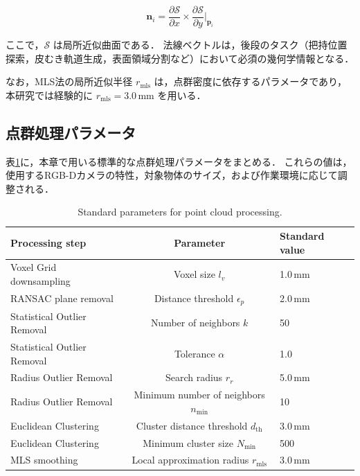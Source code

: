 \begin{equation}
  \bm{n}_i = \frac{\partial \mathcal{S}}{\partial x} \times \frac{\partial \mathcal{S}}{\partial y} \Big|_{\bm{p}_i}
\end{equation}

ここで，$\mathcal{S}$ は局所近似曲面である．
法線ベクトルは，後段のタスク（把持位置探索，皮むき軌道生成，表面領域分割など）において必須の幾何学情報となる．

なお，MLS法の局所近似半径 $r_{\mathrm{mls}}$ は，点群密度に依存するパラメータであり，本研究では経験的に $r_{\mathrm{mls}} = 3.0$\,mm を用いる．

\subsection{点群処理パラメータ}
\label{sec:system:pointcloud:processing:parameters}
表\ref{tab:system:pointcloud-parameters}に，本章で用いる標準的な点群処理パラメータをまとめる．
これらの値は，使用するRGB-Dカメラの特性，対象物体のサイズ，および作業環境に応じて調整される．

\begin{table}[t]
  \centering
  \caption{Standard parameters for point cloud processing.}
  \label{tab:system:pointcloud-parameters}
  \begin{tabular}{lcl}
    \toprule
    \textbf{Processing step} & \textbf{Parameter} & \textbf{Standard value} \\
    \midrule
    Voxel Grid downsampling & Voxel size $l_v$ & 1.0\,mm \\
    RANSAC plane removal & Distance threshold $\epsilon_p$ & 2.0\,mm \\
    Statistical Outlier Removal & Number of neighbors $k$ & 50 \\
    Statistical Outlier Removal & Tolerance $\alpha$ & 1.0 \\
    Radius Outlier Removal & Search radius $r_r$ & 5.0\,mm \\
    Radius Outlier Removal & Minimum number of neighbors $n_{\min}$ & 10 \\
    Euclidean Clustering & Cluster distance threshold $d_{\mathrm{th}}$ & 3.0\,mm \\
    Euclidean Clustering & Minimum cluster size $N_{\min}$ & 500 \\
    MLS smoothing & Local approximation radius $r_{\mathrm{mls}}$ & 3.0\,mm \\
    \bottomrule
  \end{tabular}
\end{table}

